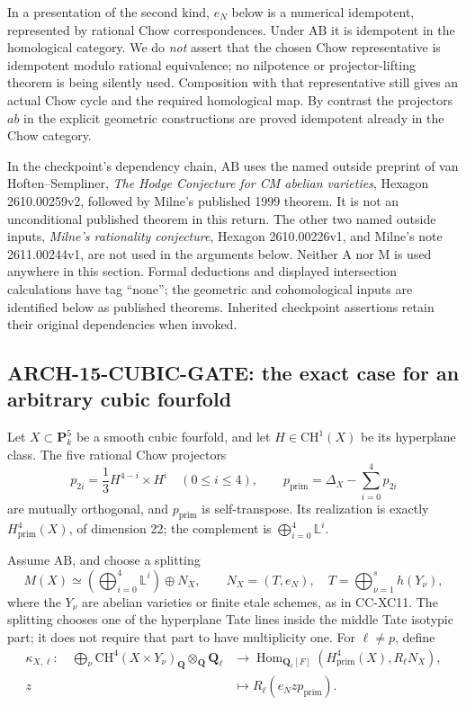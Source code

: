 In a presentation of the second kind, \(e_N\) below is a numerical
idempotent, represented by rational Chow correspondences. Under
\(\mathrm{AB}\) it is idempotent in the homological category. We do
\emph{not} assert that the chosen Chow representative is idempotent
modulo rational equivalence; no nilpotence or projector-lifting theorem
is being silently used. Composition with that representative still
gives an actual Chow cycle and the required homological map. By
contrast the projectors \(ab\) in the explicit geometric constructions
are proved idempotent already in the Chow category.

In the checkpoint's dependency chain, \(\mathrm{AB}\) uses the named
outside preprint of van Hoften--Sempliner, \emph{The Hodge Conjecture for
CM abelian varieties}, Hexagon 2610.00259v2, followed by Milne's published
1999 theorem. It is not an unconditional published theorem in this
return. The other two named outside inputs, \emph{Milne's rationality
conjecture}, Hexagon 2610.00226v1, and Milne's note 2611.00244v1, are not
used in the arguments below. Neither A nor M is used anywhere in this
section. Formal deductions and displayed intersection calculations have
tag ``none''; the geometric and cohomological inputs are identified below
as published theorems. Inherited checkpoint assertions retain their
original dependencies when invoked.

\subsection{ARCH-15-CUBIC-GATE: the exact case for an arbitrary cubic fourfold}

Let \(X\subset\mathbf P^5_k\) be a smooth cubic fourfold, and let
\(H\in\mathrm{CH}^1(X)\) be its hyperplane class. The five rational Chow
projectors
\[
 p_{2i}=\frac13 H^{4-i}\times H^i\quad(0\leq i\leq4),\qquad
 p_{\mathrm{prim}}=\Delta_X-\sum_{i=0}^4p_{2i}
 \tag{ARCH-15.1}
\]
are mutually orthogonal, and \(p_{\mathrm{prim}}\) is self-transpose.
Its realization is exactly \(H^4_{\mathrm{prim}}(X)\), of dimension 22;
the complement is \(\bigoplus_{i=0}^4\mathbb L^i\).

Assume \(\mathrm{AB}\), and choose a splitting
\[
 M(X)\simeq\left(\bigoplus_{i=0}^4\mathbb L^i\right)\oplus N_X,
 \qquad N_X=(T,e_N),\quad T=\bigoplus_{\nu=1}^s h(Y_\nu),
 \tag{ARCH-15.2}
\]
where the \(Y_\nu\) are abelian varieties or finite etale schemes, as in
CC-XC11. The splitting chooses one of the hyperplane Tate lines inside
the middle Tate isotypic part; it does not require that part to have
multiplicity one. For \(\ell\ne p\), define
\[
 \begin{split}
 \kappa_{X,\ell}:\quad
 \bigoplus_\nu\mathrm{CH}^4(X\times Y_\nu)_{\mathbf Q}
       \otimes_{\mathbf Q}\mathbf Q_\ell
 &\longrightarrow
 \operatorname{Hom}_{\mathbf Q_\ell[F]}
       (H^4_{\mathrm{prim}}(X),R_\ell N_X),\\
 z&\longmapsto R_\ell(e_N z p_{\mathrm{prim}}).
 \end{split}
 \tag{ARCH-15.3}
\]


